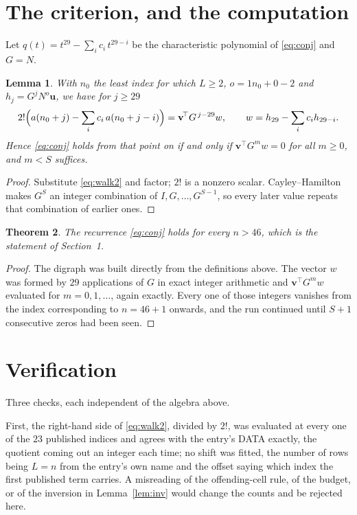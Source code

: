 \documentclass[11pt,a4paper]{article}
\theoremstyle{plain}
\newtheorem{theorem}{Theorem}
\newtheorem{lemma}[theorem]{Lemma}
\theoremstyle{definition}
\begin{document}
\section{The criterion, and the computation}

Let $q(t)=t^{29}-\sum_i c_i\,t^{29-i}$ be the characteristic polynomial of
\eqref{eq:conj} and $G=N$.

\begin{lemma}\label{lem:crit}
With $n_0$ the least index for which $L\ge2$, $o=1n_0+0-2$ and
$h_j=G^{j}N^{o}\mathbf{u}$, we have for $j\ge29$
\[
2!\Bigl(a(n_0+j)-\sum_i c_i\,a(n_0+j-i)\Bigr)=\mathbf{v}^{\!\top}G^{\,j-29}w,
\qquad w=h_{29}-\sum_i c_i h_{29-i} .
\]
Hence \eqref{eq:conj} holds from that point on if and only if
$\mathbf{v}^{\!\top}G^{m}w=0$ for all $m\ge0$, and $m<S$ suffices.
\end{lemma}

\begin{proof}
Substitute \eqref{eq:walk2} and factor; $2!$ is a nonzero scalar. Cayley--Hamilton
makes $G^{S}$ an integer combination of $I,G,\dots,G^{S-1}$, so every later value repeats
that combination of earlier ones.
\end{proof}

\begin{theorem}
The recurrence \eqref{eq:conj} holds for every $n>46$, which is the statement of
Section~1.
\end{theorem}

\begin{proof}
The digraph was built directly from the definitions above. The vector $w$ was formed by
$29$ applications of $G$ in exact integer arithmetic and $\mathbf{v}^{\!\top}G^{m}w$
evaluated for $m=0,1,\dots$, again exactly. Every one of those integers vanishes from the
index corresponding to $n=46+1$ onwards, and the run continued until $S+1$ consecutive
zeros had been seen.
\end{proof}

\section{Verification}

Three checks, each independent of the algebra above.

First, the right-hand side of \eqref{eq:walk2}, divided by $2!$, was evaluated at every
one of the $23$ published indices and agrees with the entry's DATA exactly, the quotient
coming out an integer each time; no shift was fitted, the number of rows being
$L=n$ from the entry's own name and the offset saying which index the first published
term carries. A misreading of the offending-cell rule, of the budget, or of the inversion in
Lemma~\ref{lem:inv} would change the counts and be rejected here.
\end{document}
